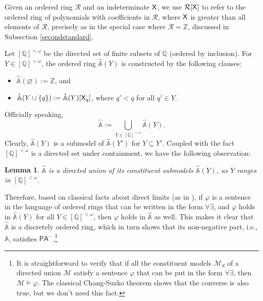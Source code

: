 \documentclass{amsart}
\newtheorem{lem}[theorem]{Lemma}
\newcommand{\mc}[1]{\mathcal #1}
\newcommand{\X}{{\sf X}}
\newcommand{\fsvar}{Y}
\begin{document}
 

 Given an ordered ring $\mc R$ and an indeterminate $\X$, we use $\mc R[\X]$ to refer to the ordered ring of polynomials with coefficients in $\mc R$, where $\X$ is greater than all elements of $\mc R$, precisely as in the special case where $\mc R=\mathbb{Z}$, discussed in Subsection \ref{secondstandard}.
 
 Let $[\mathbb{Q}]^{<\omega}$ be the directed set of finite subsets of $\mathbb{Q}$ (ordered by inclusion). For $\fsvar\in [\mathbb{Q}]^{<\omega}$, the ordered ring $\hat{\mathbb{A}}(\fsvar)$ is constructed by the following clauses: 
  \begin{itemize}
 \item $\hat{\mathbb{A}}({\varnothing}):=\mathbb{Z}$, and 
 \item $\hat{\mathbb{A}}({\fsvar\cup\{q\}}):=\hat{\mathbb{A}}(\fsvar)[\X_q]$, where $q'<q$ for all $q'\in \fsvar.$
 \end{itemize}

 Officially speaking, $$\hat{\mathbb{A}}:=\bigcup\limits_{\fsvar\in [\mathbb{Q}]^{<\omega}}\hat{\mathbb{A}}(\fsvar).$$ 
 Clearly, $\hat{\mathbb{A}}(\fsvar)$ is a submodel of $\hat{\mathbb{A}}(\fsvar')$ for $\fsvar\subseteq \fsvar'$. Coupled with the fact $[\mathbb{Q}]^{<\omega}$ is a directed set under containment, we have the following observation:
 
 \begin{lem} \label{hatA-directed_union} $\hat{\mathbb{A}}$ is a directed union of its constituent submodels $\hat{\mathbb{A}}(\fsvar)$, as $\fsvar$ ranges in $ [\mathbb{Q}]^{<\omega}$.
 \end{lem}
 
 Therefore, based on classical facts about direct limits (as in \cite[Section 2.3]{hodg:mode93}), if $\varphi$ is a sentence in the language of ordered rings that can be written in the form %
 $\forall\exists$, and $\varphi$ holds in $\hat{\mathbb{A}}(\fsvar)$ for all $\fsvar\in [\mathbb{Q}]^{<\omega}$, 
 then $\varphi$ holds in $\hat{\mathbb{A}}$ as well. This makes it clear that $\hat{\mathbb{A}}$ is a discretely ordered ring, which in turn shows that its non-negative part, i.e., $\mathbb{A}$, satisfies $\mathsf{PA^-}$.\footnote{It is straightforward to verify that if all the constituent models $\mathcal{M}_d$ of a directed union $\mathcal{M}$ satisfy a sentence $\varphi$ that can be put in the form $\forall \exists$, then $\mathcal{M}\models \varphi.$ The classical Chang-Suzko theorem shows that the converse is also true, but we don't need this fact.}
 
\end{document}
